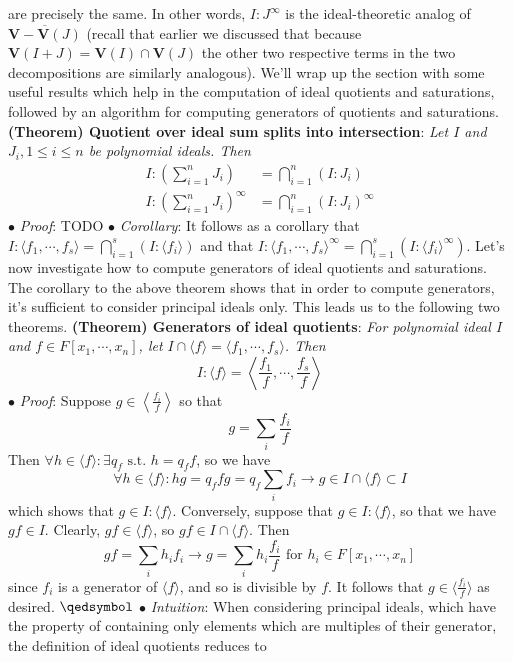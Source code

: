 \documentclass{article}
\newcommand*{\tb}{\textbf}
\newcommand*{\ti}{\textit}
\newcommand*{\n}{\newline}
\newcommand*{\nn}{\newline \newline}
\newcommand*{\Fx}{\ensuremath{F[x_1, \cdots, x_n]}}
\newcommand*{\lfsr}{\langle f_1, \cdots, f_s \rangle}
\newcommand*{\V}{\ensuremath{\mathbf{V}}}
\begin{document}
are precisely the same. In other words, $ I : J^\infty $ is the ideal-theoretic analog of $ \overline{\V - \V(J)} $ (recall that earlier we discussed that because $ \V(I + J) = \V(I) \cap \V(J) $ the other two respective terms in the two decompositions are similarly analogous). We'll wrap up the section with some useful results which help in the computation of ideal quotients and saturations, followed by an algorithm for computing generators of quotients and saturations.
\nn
\tb{(Theorem) Quotient over ideal sum splits into intersection}: \ti{Let $ I $ and $ J_i, 1 \leq i \leq n $ be polynomial ideals. Then}
$$ \begin{aligned}
    I : \left( \sum_{i = 1}^n J_i \right) &= \bigcap_{i = 1}^n (I : J_i) \\
    I : \left( \sum_{i = 1}^n J_i \right)^\infty &= \bigcap_{i = 1}^n (I : J_i)^\infty
\end{aligned} $$
\indent $ \bullet $ \ti{Proof}: TODO
\n
\indent $ \bullet $ \ti{Corollary}: It follows as a corollary that $ I : \lfsr = \bigcap_{i = 1}^s (I : \langle f_i \rangle) $ and that $ I : \lfsr^\infty = \bigcap_{i = 1}^s (I : \langle f_i \rangle^\infty) $.
\nn
Let's now investigate how to compute generators of ideal quotients and saturations. The corollary to the above theorem shows that in order to compute generators, it's sufficient to consider principal ideals only. This leads us to the following two theorems.
\nn
\tb{(Theorem) Generators of ideal quotients}: \ti{For polynomial ideal $ I $ and $ f \in \Fx $, let $ I \cap \langle f \rangle = \lfsr $. Then}
$$ I : \langle f \rangle = \left \langle \frac{f_1}{f}, \cdots, \frac{f_s}{f} \right \rangle $$
\indent $ \bullet $ \ti{Proof}: Suppose $ g \in \left \langle \frac{f_i}{f} \right \rangle $ so that
$$ g = \sum_i \frac{f_i}{f} $$
Then $ \forall h \in \langle f \rangle: \exists q_f \text{ s.t. } h = q_f f $, so we have
$$ \forall h \in \langle f \rangle: h g = q_f f g = q_f \sum_i f_i \rightarrow g \in I \cap \langle f \rangle \subset I $$
which shows that $ g \in I : \langle f \rangle $. Conversely, suppose that $ g \in I : \langle f \rangle $, so that we have $ g f \in I $. Clearly, $ g f \in \langle f \rangle $, so $ g f \in I \cap \langle f \rangle $. Then
$$ g f = \sum_i h_i f_i \rightarrow g = \sum_i h_i \frac{f_i}{f} \text{ for } h_i \in \Fx$$
since $ f_i $ is a generator of $ \langle f \rangle $, and so is divisible by $ f $. It follows that $ g \in \langle \frac{f_i}{f} \rangle $ as desired. $ \qedsymbol $
\n
\indent $ \bullet $ \ti{Intuition}: When considering principal ideals, which have the property of containing only elements which are multiples of their generator, the definition of ideal quotients reduces to
\end{document}
